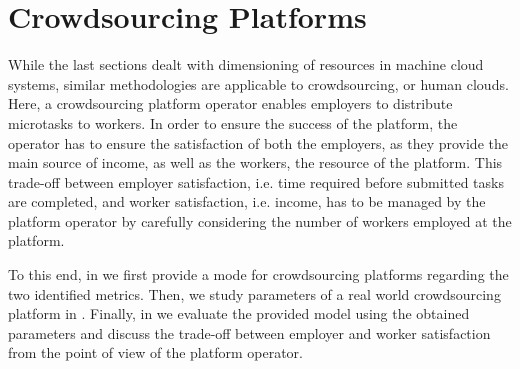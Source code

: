 \section{Crowdsourcing Platforms}\label{sec:cloud:crowdsourcing}
\newcommand{\campaignIAT}{\ensuremath{t_c}\xspace}
\newcommand{\campaignSize}{\ensuremath{\Theta}\xspace}
\newcommand{\taskDuration}{\ensuremath{B}\xspace}
\newcommand{\meanTaskLength}{\ensuremath{E[B]}\xspace}
\newcommand{\numberOfWorkers}{\ensuremath{c}\xspace}
\newcommand{\workerUtilization}{\ensuremath{\rho}\xspace}
\newcommand{\campaignDuration}{\ensuremath{\delta}\xspace}
\newcommand{\preTaskProcessingDelay}{\ensuremath{E[D]}\xspace}
While the last sections dealt with dimensioning of resources in machine cloud systems, similar methodologies are applicable to crowdsourcing, or human clouds.
Here, a crowdsourcing platform operator enables employers to distribute microtasks to workers.
In order to ensure the success of the platform, the operator has to ensure the satisfaction of both the employers, as they provide the main source of income, as well as the workers, the resource of the platform.
This trade-off between employer satisfaction, i.e. time required before submitted tasks are completed, and worker satisfaction, i.e. income, has to be managed by the platform operator by carefully considering the number of workers employed at the platform.

To this end, in  we first provide a mode for crowdsourcing platforms regarding the two identified metrics.
Then, we study parameters of a real world crowdsourcing platform in .
Finally, in  we evaluate the provided model using the obtained parameters and discuss the trade-off between employer and worker satisfaction from the point of view of the platform operator.



